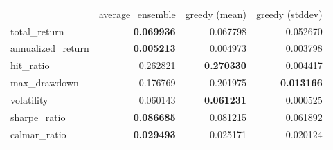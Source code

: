 \begin{tabular}{lrrr}
 & average_ensemble & greedy (mean) & greedy (stddev) \\
total_return & \bfseries 0.069936 & 0.067798 & 0.052670 \\
annualized_return & \bfseries 0.005213 & 0.004973 & 0.003798 \\
hit_ratio & 0.262821 & \bfseries 0.270330 & 0.004417 \\
max_drawdown & -0.176769 & -0.201975 & \bfseries 0.013166 \\
volatility & 0.060143 & \bfseries 0.061231 & 0.000525 \\
sharpe_ratio & \bfseries 0.086685 & 0.081215 & 0.061892 \\
calmar_ratio & \bfseries 0.029493 & 0.025171 & 0.020124 \\
\end{tabular}

